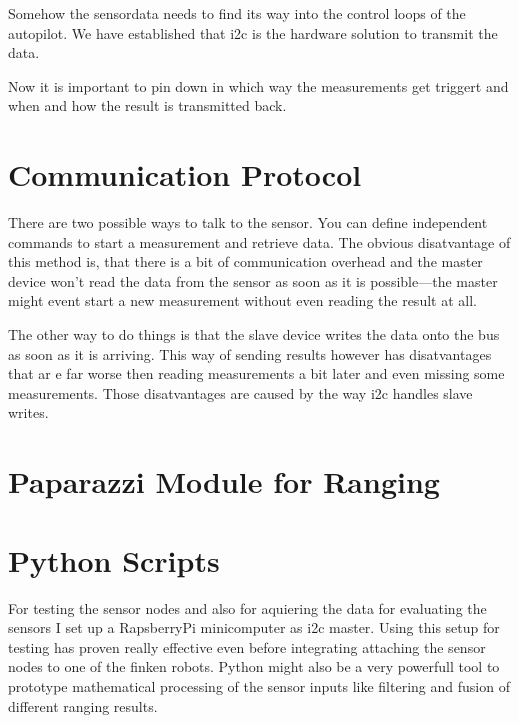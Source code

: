 
Somehow the sensordata needs to find its way into the control loops of the autopilot.
We have established that i2c is the hardware solution to transmit the data.

Now it is important to pin down in which way the measurements get triggert and when and how the result is transmitted back.

\section{Communication Protocol}

There are two possible ways to talk to the sensor.
You can define independent commands to start a measurement and retrieve data.
The obvious disatvantage of this method is, that there is a bit of communication overhead and the master device won't read the data from the sensor as soon as it is possible—the master might event start a new measurement without even reading the result at all.

The other way to do things is that the slave device writes the data onto the bus as soon as it is arriving.
This way of sending results however has disatvantages that ar e far worse then reading measurements a bit later and even missing some measurements.
Those disatvantages are caused by the way i2c handles slave writes.


\section{Paparazzi Module for Ranging}


\section{Python Scripts}

For testing the sensor nodes and also for aquiering the data for evaluating the sensors I set up a RapsberryPi minicomputer as i2c master.
Using this setup for testing has proven really effective even before integrating attaching the sensor nodes to one of the finken robots.
Python might also be a very powerfull tool to prototype mathematical processing of the sensor inputs like filtering and fusion of different ranging results.
